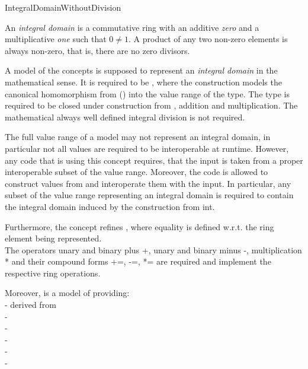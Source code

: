 \begin{ccRefConcept}{IntegralDomainWithoutDivision}


\ccDefinition

An {\em integral domain} is a commutative ring with an additive {\em zero} and a multiplicative {\em one} such that $0 \neq 1$.  A product of any two non-zero elements is always non-zero, that is, there are no zero divisors. 

A model of the concepts  is supposed to represent an {\em integral domain} in the mathematical sense. It is required to be , where the construction models the canonical homomorphism from \Z () into the value range of the type. The type is required to be closed under construction from , addition and multiplication. The mathematical always well defined integral division is not required. 

\begin{ccAdvanced}

The full value range of a model may not represent an integral domain, in particular not all values are required to be interoperable at runtime. However, any code that is using this concept requires, that the input is taken from a proper interoperable subset of the value range. Moreover, the code is allowed to construct values from  and interoperate them with the input. In particular, any subset of the value range representing an integral domain is required to contain the integral domain induced by the construction from int.

\end{ccAdvanced}


Furthermore, the concept refines , where equality is defined w.r.t. 
the ring element being represented. \\
The operators unary and binary plus +, unary and binary minus -, 
multiplication * and their compound forms +=, -=, *= are required and 
implement the respective ring operations.

Moreover,  is a model of 
 providing:\\ 
-  derived from  \\
-   \\
-   \\
-   \\
-  \\
-  \\



\end{ccRefConcept}
